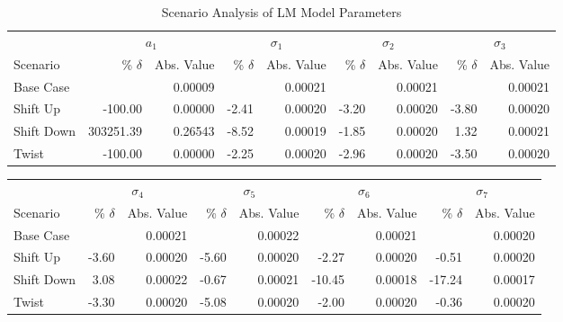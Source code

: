 \begin{table}[H]
  \centering
  \setlength{\tabcolsep}{5pt} 
  \caption{Scenario Analysis of LM Model Parameters}
  \label{tab:scenario_analysis_part_lm}
  \begin{threeparttable}
    \begin{tabular}{l *{4}{rr}}
      \toprule
      & \multicolumn{2}{c}{$a_1$} & \multicolumn{2}{c}{$\sigma_1$} & \multicolumn{2}{c}{$\sigma_2$} & \multicolumn{2}{c}{$\sigma_3$} \\
      \cmidrule(lr){2-3} \cmidrule(lr){4-5} \cmidrule(lr){6-7} \cmidrule(lr){8-9}
      Scenario & \% $\delta$ & Abs. Value & \% $\delta$ & Abs. Value & \% $\delta$ & Abs. Value & \% $\delta$ & Abs. Value \\
      \midrule
      
      Base Case          &             & 0.00009 &           & 0.00021 &           & 0.00021 &           & 0.00021 \\
      Shift Up   &   -100.00   & 0.00000 &   -2.41   & 0.00020 &   -3.20   & 0.00020 &   -3.80   & 0.00020 \\
      Shift Down & 303251.39   & 0.26543 &   -8.52   & 0.00019 &   -1.85   & 0.00020 &    1.32   & 0.00021 \\
      Twist    &   -100.00   & 0.00000 &   -2.25   & 0.00020 &   -2.96   & 0.00020 &   -3.50   & 0.00020 \\
      \bottomrule
    \end{tabular}
  \end{threeparttable}
\end{table}

\begin{table}[H]
  \centering
  \setlength{\tabcolsep}{5pt}
  \begin{threeparttable}
    \begin{tabular}{l *{4}{rr}}
      & \multicolumn{2}{c}{$\sigma_4$} & \multicolumn{2}{c}{$\sigma_5$} & \multicolumn{2}{c}{$\sigma_6$} & \multicolumn{2}{c}{$\sigma_7$} \\
      \cmidrule(lr){2-3} \cmidrule(lr){4-5} \cmidrule(lr){6-7} \cmidrule(lr){8-9}
      Scenario & \% $\delta$ & Abs. Value & \% $\delta$ & Abs. Value & \% $\delta$ & Abs. Value & \% $\delta$ & Abs. Value \\
      \midrule
      
      Base Case          &           & 0.00021 &           & 0.00022 &           & 0.00021 &           & 0.00020 \\
      Shift Up   &   -3.60   & 0.00020 &   -5.60   & 0.00020 &   -2.27   & 0.00020 &   -0.51   & 0.00020 \\
      Shift Down &    3.08   & 0.00022 &   -0.67   & 0.00021 &  -10.45   & 0.00018 &  -17.24   & 0.00017 \\
      Twist    &   -3.30   & 0.00020 &   -5.08   & 0.00020 &   -2.00   & 0.00020 &   -0.36   & 0.00020 \\
      \bottomrule
    \end{tabular}
  \end{threeparttable}
\end{table}


